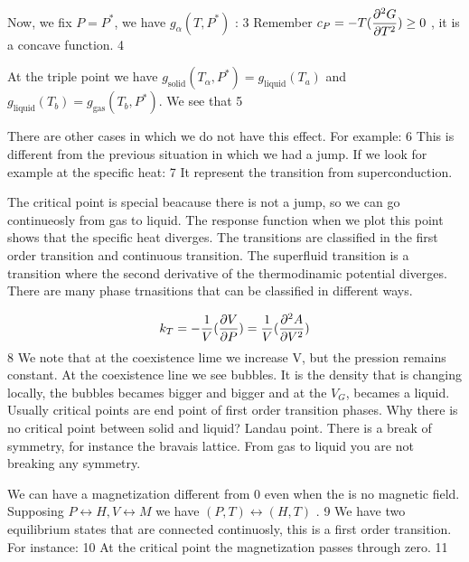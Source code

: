 \documentclass[../main/main.tex]{subfiles}
\begin{document}
Now, we fix \( P = P^* \), we have \( g_ \alpha (T,P^*) \) :
3
Remember \( c_P = - T ( \displaystyle \frac{\partial^{2} G}{\partial T^{2} } ) \ge 0 \) , it is a concave function.
4

At the triple point we have \( g_{\text{solid}}(T_ \alpha, P^*) = g_{\text{liquid}}(T_a) \) and \( g_{\text{liquid}}(T_b) = g_{\text{gas}}(T_b , P^*) \).
We see that
5

There are other cases in which we do not have this effect. For example:
6
This is different from the previous situation in which we had a jump.
If we look for example at the specific heat:
7
It represent the transition from superconduction.

The critical point is special beacause there is not a jump, so we can go continueosly from gas to liquid. The response function when we plot this point shows that the specific heat diverges.
The transitions are classified in the first order transition and continuous transition. The superfluid transition is a transition where the second derivative of the thermodinamic potential diverges. There are many phase trnasitions that can be classified in different ways.

\[ k_T = - \frac{1}{V} ( \displaystyle \frac{\partial V}{\partial P} ) = \frac{1}{V} (\displaystyle \frac{\partial^{2} A}{\partial V^{2} } ) \]
8
We note that at the coexistence lime we increase V, but the pression remains constant. At the coexistence line we see bubbles. It is the density that is changing locally, the bubbles becames bigger and bigger and at the $V_G$, becames a liquid.
Usually critical points are end point of first order transition phases. Why there is no critical point between solid and liquid? Landau point. There is a break of symmetry, for instance the bravais lattice.
From gas to liquid you are not breaking any symmetry.

We can have a magnetization different from 0 even when the is no magnetic field.
Supposing \( P \leftrightarrow H, V \leftrightarrow M \) we have \( (P,T) \leftrightarrow (H,T) \) .
9
We have two equilibrium states that are connected continuosly, this is a first order transition.
For instance:
10
At the critical point the magnetization passes through zero.
11
\end{document}
